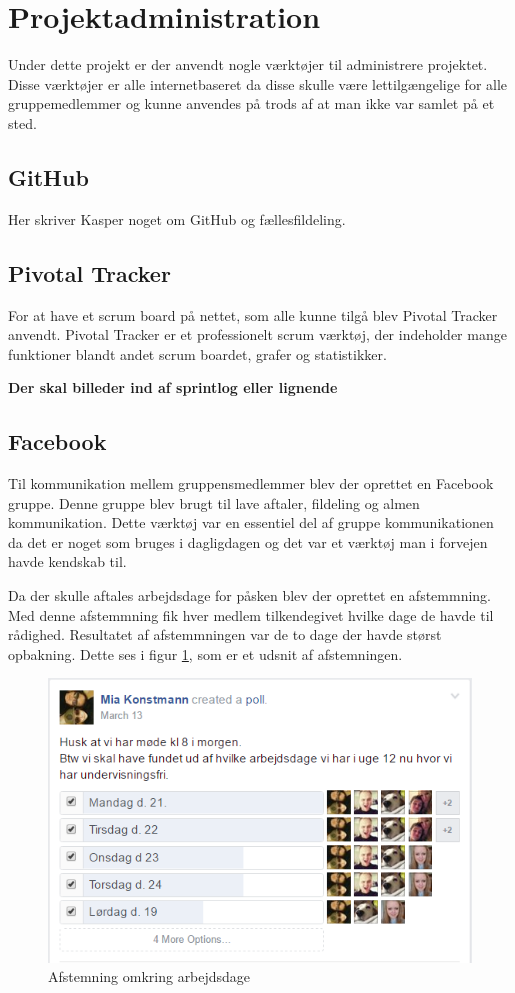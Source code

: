 \section{Projektadministration}
Under dette projekt er der anvendt nogle værktøjer til administrere projektet. Disse værktøjer er alle internetbaseret da disse skulle være lettilgængelige for alle gruppemedlemmer og kunne anvendes på trods af at man ikke var samlet på et sted.

\subsection{GitHub}
Her skriver Kasper noget om GitHub og fællesfildeling. 

\subsection{Pivotal Tracker}
For at have et scrum board på nettet, som alle kunne tilgå blev Pivotal Tracker anvendt. Pivotal Tracker er et professionelt scrum værktøj, der indeholder mange funktioner blandt andet scrum boardet, grafer og statistikker.

\textbf{Der skal billeder ind af sprintlog eller lignende} 

\subsection{Facebook}
Til kommunikation mellem gruppensmedlemmer blev der oprettet en Facebook gruppe. Denne gruppe blev brugt til lave aftaler, fildeling og almen kommunikation. Dette værktøj var en essentiel del af gruppe kommunikationen da det er noget som bruges i dagligdagen og det var et værktøj man i forvejen havde kendskab til. \newline

Da der skulle aftales arbejdsdage for påsken blev der oprettet en afstemmning. Med denne afstemmning fik hver medlem tilkendegivet hvilke dage de havde til rådighed. Resultatet af afstemmningen var de to dage der havde størst opbakning. Dette ses i figur \ref{ref:fbpoll}, som er et udsnit af afstemningen.
\begin{figure}[H]
	\centering
	\includegraphics[scale=0.6]{Projektgennemfoerelse/images/fbpoll}
	\caption{Afstemning omkring arbejdsdage}
	\label{ref:fbpoll}
\end{figure}

